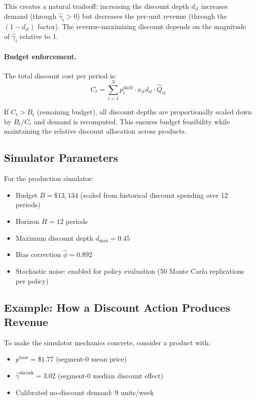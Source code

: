 \documentclass[12pt,a4paper]{article}
\begin{document}
This creates a natural tradeoff: increasing the discount depth
$d_{it}$ increases demand (through $\hat{\gamma}_i > 0$) but
decreases the per-unit revenue (through the $(1 - d_{it})$ factor).
The revenue-maximizing discount depends on the magnitude of
$\hat{\gamma}_i$ relative to 1.

\paragraph{Budget enforcement.}
The total discount cost per period is:
\begin{equation}
C_t = \sum_{i=1}^{N} p_i^{\text{shelf}} \cdot x_{it} d_{it}
\cdot \hat{Q}_{it}
\end{equation}

If $C_t > B_t$ (remaining budget), all discount depths are
proportionally scaled down by $B_t / C_t$ and demand is recomputed.
This ensures budget feasibility while maintaining the relative
discount allocation across products.

\subsection{Simulator Parameters}

For the production simulator:
\begin{itemize}[nosep]
\item Budget $B = \$13{,}134$ (scaled from historical discount
spending over 12 periods)
\item Horizon $H = 12$ periods
\item Maximum discount depth $d_{\max} = 0.45$
\item Bias correction $\hat{\phi} = 0.892$
\item Stochastic noise: enabled for policy evaluation (50 Monte
Carlo replications per policy)
\end{itemize}

\subsection{Example: How a Discount Action Produces Revenue}

To make the simulator mechanics concrete, consider a product with:
\begin{itemize}[nosep]
\item $p^{\text{base}} = \$1.77$ (segment-0 mean price)
\item $\hat{\gamma}^{\text{shrunk}} = 3.02$ (segment-0 median
discount effect)
\item Calibrated no-discount demand: 9 units/week
\end{itemize}
\end{document}
